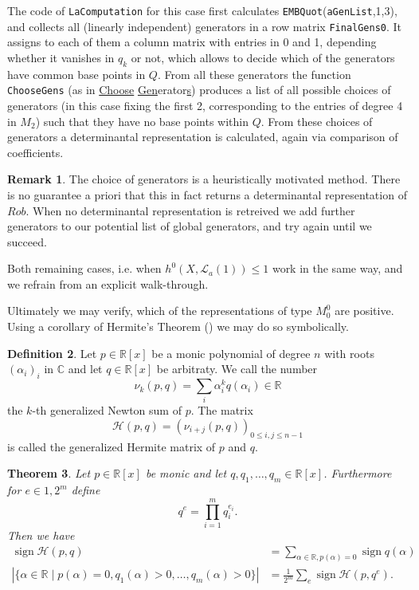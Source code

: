 \documentclass[a4paper,10pt]{amsart}
\theoremstyle{definition}
\newtheorem{Def}{Definition}[section]
\newtheorem{rem}[Def]{Remark}
\theoremstyle{plain}
\newtheorem{thm}[Def]{Theorem}
\newcommand{\cL}{{\mathcal L}}
\newcommand{\C}{{\mathbb C}}
\newcommand{\R}{{\mathbb R}}
\begin{document}
The code of \texttt{LaComputation} for this case first calculates \texttt{EMBQuot}(\texttt{aGenList},1,3), and collects all (linearly independent) generators in a row matrix \texttt{FinalGens0}. It assigns to each of them a column matrix with entries in 0 and 1, depending whether it vanishes in $q_k$ or not, which allows to decide which of the generators have common base points in $Q$. From all these generators the function \texttt{ChooseGens} (as in \underline{Choose} \underline{Gen}erator\underline{s}) produces a list of all possible choices of generators (in this case fixing the first 2, corresponding to the entries of degree 4 in $M_2$) such that they have no base points within $Q$. From these choices of generators a determinantal representation is calculated, again via comparison of coefficients.

\begin{rem}
    The choice of generators is a heuristically motivated method. There is no guarantee a priori that this in fact returns a determinantal representation of $Rob$. When no determinantal representation is retreived we add further generators to our potential list of global generators, and try again until we succeed.
\end{rem}

Both remaining cases, i.e. when $h^0(X, \cL_a(1)) \leq 1$ work in the same way, and we refrain from an explicit walk-through.

Ultimately we may verify, which of the representations of type $M_0^0$ are positive. Using a corollary of Hermite's Theorem (\cite[Theorem 4.13]{BasuPollackRoyAlg}) we may do so symbolically.
\begin{Def}
    Let $p \in \R[x]$ be a monic polynomial of degree $n$ with roots $(\alpha_i)_i$ in $\C$ and let $q \in \R[x]$ be arbitraty. We call the number
    \begin{equation*}
        \nu_k(p,q) = \sum_i \alpha_i^kq(\alpha_i) \in \R
    \end{equation*}
    the $k$-th generalized Newton sum of $p$. The matrix
    \begin{equation*}
        \mathscr{H}(p,q) = (\nu_{i+j}(p,q))_{0 \leq i,j \leq n-1}
    \end{equation*}
    is called the generalized Hermite matrix of $p$ and $q$.
\end{Def}

\begin{thm}
    Let $p \in \R[x]$ be monic and let $q, q_1, \dots, q_m \in \R[x]$. Furthermore for $e \in {1,2}^m$ define
    \begin{equation*}
        q^e = \prod_{i=1}^m q_i^{e_i}.
    \end{equation*}
    Then we have
    \begin{align*}
        \operatorname{sign} \mathscr{H}(p,q) &= \sum_{\alpha \in \R, p(\alpha) = 0} \operatorname{sign} q(\alpha) \\
        |\{ \alpha \in \R \mid p(\alpha) = 0, q_1(\alpha) > 0, \dots, q_m(\alpha) > 0 \}| &= \frac{1}{2^m} \sum_e \operatorname{sign} \mathscr{H}(p,q^e).
    \end{align*}
\end{thm}
\end{document}
